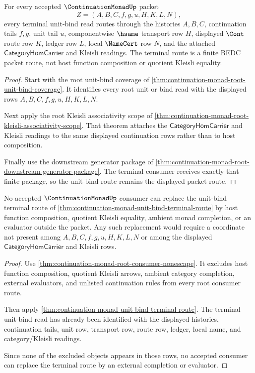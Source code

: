 \begin{theorem}
\label{thm:continuation-monad-unit-bind-terminal-route}
For every accepted $\ContinuationMonadUp$ packet
$$
Z=(A,B,C,f,g,u,H,K,L,N),
$$
every terminal unit-bind read routes through the histories $A,B,C$, continuation tails $f,g$, unit tail $u$, componentwise $\hsame$ transport row $H$, displayed $\Cont$ route row $K$, ledger row $L$, local $\NameCert$ row $N$, and the attached $\mathsf{CategoryHomCarrier}$ and Kleisli readings. The terminal route is a finite BEDC packet route, not host function composition or quotient Kleisli equality.
\end{theorem}
\begin{proof}
Start with the root unit-bind coverage of \autoref{thm:continuation-monad-root-unit-bind-coverage}. It identifies every root unit or bind read with the displayed rows $A,B,C,f,g,u,H,K,L,N$.

Next apply the root Kleisli associativity scope of \autoref{thm:continuation-monad-root-kleisli-associativity-scope}. That theorem attaches the $\mathsf{CategoryHomCarrier}$ and Kleisli readings to the same displayed continuation rows rather than to host composition.

Finally use the downstream generator package of \autoref{thm:continuation-monad-root-downstream-generator-package}. The terminal consumer receives exactly that finite package, so the unit-bind route remains the displayed packet route.
\end{proof}

\begin{theorem}
\label{thm:continuation-monad-unit-bind-completion-nonescape}
No accepted $\ContinuationMonadUp$ consumer can replace the unit-bind terminal route of \autoref{thm:continuation-monad-unit-bind-terminal-route} by host function composition, quotient Kleisli equality, ambient monad completion, or an evaluator outside the packet. Any such replacement would require a coordinate not present among $A,B,C,f,g,u,H,K,L,N$ or among the displayed $\mathsf{CategoryHomCarrier}$ and Kleisli rows.
\end{theorem}
\begin{proof}
Use \autoref{thm:continuation-monad-root-consumer-nonescape}. It excludes host function composition, quotient Kleisli arrows, ambient category completion, external evaluators, and unlisted continuation rules from every root consumer route.

Then apply \autoref{thm:continuation-monad-unit-bind-terminal-route}. The terminal unit-bind read has already been identified with the displayed histories, continuation tails, unit row, transport row, route row, ledger, local name, and category/Kleisli readings.

Since none of the excluded objects appears in those rows, no accepted consumer can replace the terminal route by an external completion or evaluator.
\end{proof}

